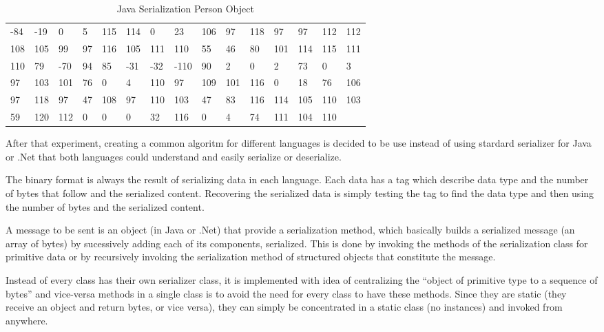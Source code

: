 \begin{table}[]
\centering
\begin{tabular}{lllllllllllllll}
  -84 & -19 & 0   & 5  & 115 & 114 & 0   & 23   & 106 & 97  & 118 & 97  & 97  & 112  & 112 \\
  108 & 105 & 99  & 97 & 116 & 105 & 111 & 110  & 55  & 46  & 80  & 101 & 114 & 115  & 111 \\
  110 & 79  & -70 & 94 & 85  & -31 & -32 & -110 & 90  & 2   & 0   & 2   & 73  & 0    & 3 \\
  97  & 103 & 101 & 76 & 0   & 4   & 110 & 97   & 109 & 101 & 116 & 0   & 18  & 76   & 106 \\
  97  & 118 & 97  & 47 & 108 & 97  & 110 & 103  & 47  & 83  & 116 & 114 & 105 & 110  & 103 \\
  59  & 120 & 112 & 0  & 0   & 0   & 32  & 116  & 0   & 4   & 74  & 111 & 104 & 110  &     \\
\end{tabular}
\caption[Java Serialization Person Object]{Java Serialization Person Object}
\label{tab:javaserilazitaon}
\end{table}

After that experiment, creating a common algoritm for different languages is decided to be use instead of using stardard serializer for Java or .Net that both languages could understand and easily serialize or deserialize.

The binary format is always the result of serializing data in each language. Each data has a tag which describe data type and the number of bytes that follow and the serialized content. Recovering the serialized data is simply testing the tag to find the data type and then using the number of bytes and the serialized content.

A message to be sent is an object (in Java or .Net) that provide a serialization method, which basically builds a serialized message (an array of bytes) by sucessively adding each of its components, serialized. This is done by invoking the methods of the serialization class for primitive data or by recursively invoking the serialization method of structured objects that constitute the message.

Instead of every class has their own serializer class, it is implemented with idea of centralizing the “object of primitive type to a sequence of bytes” and vice-versa methods in a single class is to avoid the need for every class to have these methods. Since they are static (they receive an object and return bytes, or vice versa), they can simply be concentrated in a static class (no instances) and invoked from anywhere.\\

